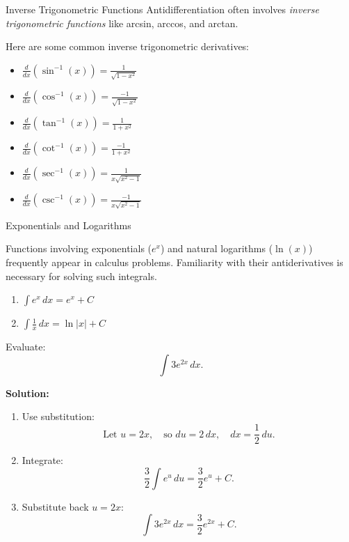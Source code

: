 \documentclass[12pt]{article}
\theoremstyle{beautifulthm}
\begin{document}
\begin{mytheorem}{Inverse Trigonometric Functions}{}
Antidifferentiation often involves \textit{inverse trigonometric functions} like arcsin, arccos, and arctan. 

Here are some common inverse trigonometric derivatives:
\begin{itemize}
    \item \(\frac{d}{dx} \left( \sin^{-1}(x) \right) = \frac{1}{\sqrt{1-x^2}}\)
    \item \(\frac{d}{dx} \left( \cos^{-1}(x) \right) = \frac{-1}{\sqrt{1-x^2}}\)
    \item \(\frac{d}{dx} \left( \tan^{-1}(x) \right) = \frac{1}{1+x^2}\)
    \item \(\frac{d}{dx} \left( \cot^{-1}(x) \right) = \frac{-1}{1+x^2}\)
    \item \(\frac{d}{dx} \left( \sec^{-1}(x) \right) = \frac{1}{x\sqrt{x^2-1}}\)
    \item \(\frac{d}{dx} \left( \csc^{-1}(x) \right) = \frac{-1}{x\sqrt{x^2-1}}\)
\end{itemize}
\end{mytheorem}

\begin{mytheorem}{Exponentials and Logarithms}{}

Functions involving exponentials ($e^x$) and natural logarithms ($\ln(x)$) frequently appear in calculus problems. Familiarity with their antiderivatives is necessary for solving such integrals.

\begin{enumerate}
    \item \(\int e^x \, dx = e^x + C\)
    \item \(\int \frac{1}{x} \, dx = \ln|x| + C\)
\end{enumerate}

\end{mytheorem}

\begin{tcolorbox}[colback=examplebg, colframe=red!75!black, title=\textbf{EXAMPLE 3: Find the Integral of the Function}, fonttitle=\bfseries, sharp corners]
Evaluate:
\[
\int 3e^{2x} \, dx.
\]


\tcblower
\textbf{Solution:} 

\begin{enumerate}
    \item Use substitution:
    \[
    \text{Let } u = 2x, \quad \text{so } du = 2 \, dx, \quad dx = \frac{1}{2} \, du.
    \]
    \item Integrate:
    \[
    \frac{3}{2} \int e^u \, du = \frac{3}{2} e^u + C.
    \]
    \item Substitute back \( u = 2x \):
    \[
    \int 3e^{2x} \, dx = \frac{3}{2} e^{2x} + C.
    \]
\end{enumerate}

\end{tcolorbox}
\end{document}
